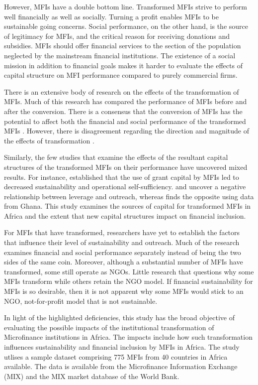 \documentclass[a4paper,nobind]{templates/ociamthesis}
\begin{document}
However, MFIs have a double bottom line. Transformed MFIs strive to perform well financially as well as socially. Turning a profit enables MFIs to be sustainable going concerns. Social performance, on the other hand, is the source of legitimacy for MFIs, and the critical reason for receiving donations and subsidies. MFIs should offer financial services to the section of the population neglected by the mainstream financial institutions. The existence of a social mission in addition to financial goals makes it harder to evaluate the effects of capital structure on MFI performance compared to purely commercial firms.

There is an extensive body of research on the effects of the transformation of MFIs. Much of this research has compared the performance of MFIs before and after the conversion. There is a consensus that the conversion of MFIs has the potential to affect both the financial and social performance of the transformed MFIs \autocite{chahine2010social,mersland2010microfinance}. However, there is disagreement regarding the direction and magnitude of the effects of transformation \autocite{mersland2010microfinance,d2017ngos}.

Similarly, the few studies that examine the effects of the resultant capital structures of the transformed MFIs on their performance have uncovered mixed results. For instance, \textcite{bogan2012capital} established that the use of grant capital by MFIs led to decreased sustainability and operational self-sufficiency. \textcite{hoque2011commercialization} and \textcite{kar2012does} uncover a negative relationship between leverage and outreach, whereas \textcite{kyereboah2007determinants} finds the opposite using data from Ghana. This study examines the sources of capital for transformed MFIs in Africa and the extent that new capital structures impact on financial inclusion.

For MFIs that have transformed, researchers have yet to establish the factors that influence their level of sustainability and outreach. Much of the research examines financial and social performance separately instead of being the two sides of the same coin. Moreover, although a substantial number of MFIs have transformed, some still operate as NGOs. Little research that questions why some MFIs transform while others retain the NGO model. If financial sustainability for MFIs is so desirable, then it is not apparent why some MFIs would stick to an NGO, not-for-profit model that is not sustainable.

In light of the highlighted deficiencies, this study has the broad objective of evaluating the possible impacts of the institutional transformation of Microfinance institutions in Africa. The impacts include how such transformation influences sustainability and financial inclusion by MFIs in Africa. The study utlises a sample dataset comprising 775 MFIs from 40 countries in Africa available. The data is available from the Microfinance Information Exchange (MIX) and the MIX market database of the World Bank.
\end{document}
